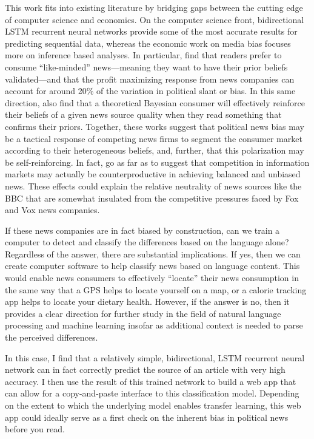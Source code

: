 \documentclass{article}
\begin{document}
		This work fits into existing literature by bridging gaps between the cutting edge of computer science and economics. On the computer science front, bidirectional LSTM recurrent neural networks provide some of the most accurate results for predicting sequential data, whereas the economic work on media bias focuses more on inference based analyses. In particular, \citet{gentzkow2010drives} find that readers prefer to consume ``like-minded'' news---meaning they want to have their prior beliefs validated---and that the profit maximizing response from news companies can account for around 20\% of the variation in political slant or bias. In this same direction, \citet{gentzkow2006media} also find that a theoretical Bayesian consumer will effectively reinforce their beliefs of a given news source quality when they read something that confirms their priors. Together, these works suggest that political news bias may be a tactical response of competing news firms to segment the consumer market according to their heterogeneous beliefs, and, further, that this polarization may be self-reinforcing. In fact, \citet{gentzkow2008competition} go as far as to suggest that competition in information markets may actually be counterproductive in achieving balanced and unbiased news. These effects could explain the relative neutrality of news sources like the BBC that are somewhat insulated from the competitive pressures faced by Fox and Vox news companies. 
		
		If these news companies are in fact biased by construction, can we train a computer to detect and classify the differences based on the language alone? Regardless of the answer, there are substantial implications. If yes, then we can create computer software to help classify news based on language content. This would enable news consumers to effectively ``locate'' their news consumption in the same way that a GPS helps to locate yourself on a map, or a calorie tracking app helps to locate your dietary health. However, if the answer is no, then it provides a clear direction for further study in the field of natural language processing and machine learning insofar as additional context is needed to parse the perceived differences. 
		
		In this case, I find that a relatively simple, bidirectional, LSTM recurrent neural network can in fact correctly predict the source of an article with very high accuracy. I then use the result of this trained network to build a web app that can allow for a copy-and-paste interface to this classification model. Depending on the extent to which the underlying model enables transfer learning, this web app could ideally serve as a first check on the inherent bias in political news before you read. 
		
\end{document}
